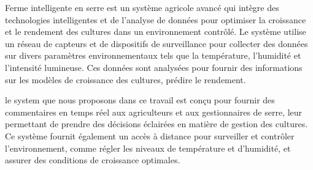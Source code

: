 \begin{abstractFr}
	
	Ferme intelligente en serre est un système agricole avancé qui intègre des technologies intelligentes et de l'analyse de données pour optimiser la croissance et le rendement des cultures dans un environnement contrôlé. Le système utilise un réseau de capteurs et de dispositifs de surveillance pour collecter des données sur divers paramètres environnementaux tels que la température, l'humidité et l'intensité lumineuse. Ces données sont analysées  pour fournir des informations sur les modèles de croissance des cultures, prédire le rendement.

le system que nous proposons dans ce travail est conçu pour fournir des commentaires en temps réel aux agriculteurs et aux gestionnaires de serre, leur permettant de prendre des décisions éclairées en matière de gestion des cultures. Ce système fournit également un accès à distance pour surveiller et contrôler l'environnement, comme régler les niveaux de température et d'humidité, et assurer des conditions de croissance optimales.
	
\end{abstractFr}

